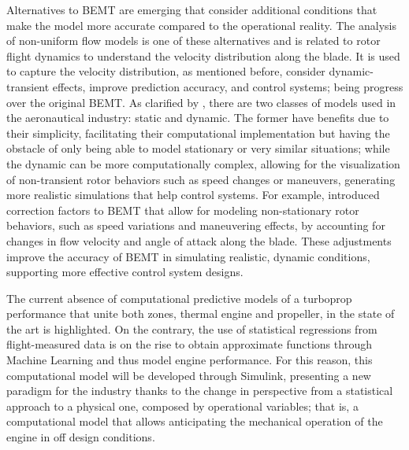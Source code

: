 \documentclass{Format}
\begin{document}
Alternatives to BEMT are emerging that consider additional conditions that make the model more accurate compared to the operational reality. The analysis of non-uniform flow models is one of these alternatives and is related to rotor flight dynamics to understand the velocity distribution along the blade. It is used to capture the velocity distribution, as mentioned before, consider dynamic-transient effects, improve prediction accuracy, and control systems; being progress over the original BEMT. As clarified by \cite{Chen1989NonuniformInflow}, there are two classes of models used in the aeronautical industry: static and dynamic. The former have benefits due to their simplicity, facilitating their computational implementation but having the obstacle of only being able to model stationary or very similar situations; while the dynamic can be more computationally complex, allowing for the visualization of non-transient rotor behaviors such as speed changes or maneuvers, generating more realistic simulations that help control systems. For example, \cite{traub2016} introduced correction factors to BEMT that allow for modeling non-stationary rotor behaviors, such as speed variations and maneuvering effects, by accounting for changes in flow velocity and angle of attack along the blade. These adjustments improve the accuracy of BEMT in simulating realistic, dynamic conditions, supporting more effective control system designs.

The current absence of computational predictive models of a turboprop performance that unite both zones, thermal engine and propeller, in the state of the art is highlighted. On the contrary, the use of statistical regressions from flight-measured data is on the rise to obtain approximate functions through Machine Learning and thus model engine performance. For this reason, this computational model will be developed through Simulink, presenting a new paradigm for the industry thanks to the change in perspective from a statistical approach to a physical one, composed by operational variables; that is, a computational model that allows anticipating the mechanical operation of the engine in off design conditions.
\end{document}
